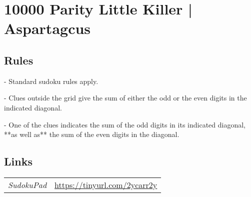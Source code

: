 \section[10000 Parity Little Killer | Aspartagcus {[\emph{Parity Little Killer Sudoku}]}]{10000 Parity Little Killer | {\normalfont Aspartagcus}}
\label{sec:47-10000-parity-little-killer-aspartagcus}

\subsection*{Rules}
\begin{markdown}
- Standard sudoku rules apply.

- Clues outside the grid give the sum of either the odd or the even digits in the indicated diagonal.

- One of the clues indicates the sum of the odd digits in its indicated diagonal, **as well as** the sum of the even digits in the diagonal.
\end{markdown}
\subsection*{Links}
\begin{tabularx}{\textwidth}{l X}
\emph{SudokuPad} & \url{https://tinyurl.com/2ycarr2y} \\
\end{tabularx}
\pagebreak
